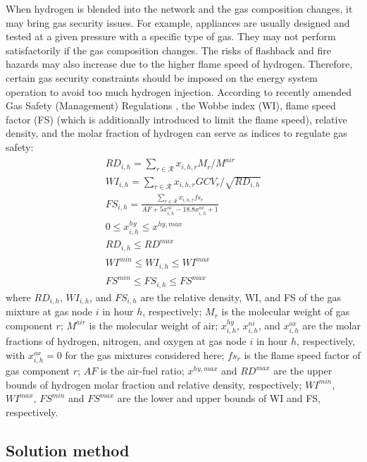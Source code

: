 \documentclass[sn-mathphys,Numbered]{sn-jnl}%
\theoremstyle{plain}%
\theoremstyle{definition}%
\theoremstyle{remark}%
\begin{document}
When hydrogen is blended into the network and the gas composition changes, it may bring gas security issues. For example, appliances are usually designed and
tested at a given pressure with a specific type of gas. They
may not perform satisfactorily if the gas composition changes. The risks of flashback and fire hazards may also increase due to the higher flame speed of hydrogen. Therefore, certain gas security constraints should be imposed on the energy system operation to avoid too much hydrogen injection. According to recently amended Gas Safety (Management) Regulations \cite{GasSafetyRegulations}, the Wobbe index (WI), flame speed factor (FS) (which is additionally introduced to limit the flame speed), relative density, and the molar fraction of hydrogen can serve as indices to regulate gas safety:
\begin{gather}
    RD_{i,h} = \sum_{r \in \mathcal{R}} x_{i,h,r} M_r / M^{air}
\label{eq relative density} \\
    WI_{i,h} = \sum_{r \in \mathcal{R}} x_{i,h,r} GCV_r / \sqrt{RD_{i,h}}
\label{eq WI} \\
    FS_{i,h} = \frac{\sum_{r \in \mathcal{R}}{x_{i,h,r} fs_r }} {AF+5x_{i,h}^{ni}-18.8x_{i,h}^{ox}+1}
\label{eq FS} \\
    0 \leq x_{i,h}^{hy} \leq x^{hy,max}
\label{eq hydrogen fraction limit}\\
    RD_{i,h} \leq  RD^{max}
\label{eq relative density limit}\\
    WI^{min} \leq WI_{i,h} \leq WI^{max}
\label{eq WI limit}\\
    FS^{min} \leq FS_{i,h} \leq FS^{max}
\label{eq flame speed limit}
\end{gather}
where $RD_{i,h}$, $WI_{i,h}$, and $FS_{i,h}$ are the relative density, WI, and FS of the gas mixture at gas node $i$ in hour $h$, respectively; $M_r$ is the molecular weight of gas component $r$; $M^{air}$ is the molecular weight of air; $x_{i,h}^{hy}$, $x_{i,h}^{ni}$, and $x_{i,h}^{ox}$ are the molar fractions of hydrogen, nitrogen, and oxygen at gas node $i$ in hour $h$, respectively, with $x_{i,h}^{ox}=0$ for the gas mixtures considered here; $fs_r$ is the flame speed factor of gas component $r$; $AF$ is the air-fuel ratio; $x^{hy,max}$ and $RD^{max}$ are the upper bounds of hydrogen molar fraction and relative density, respectively; $WI^{min}$, $WI^{max}$, $FS^{min}$ and $FS^{max}$ are the lower and upper bounds of WI and FS, respectively.

\subsection{Solution method}
\end{document}
